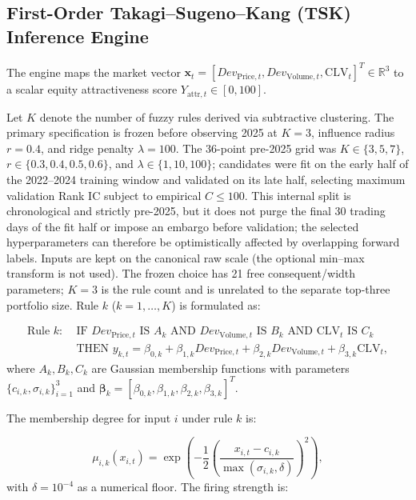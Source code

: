 \documentclass[pdflatex,sn-mathphys-num]{sn-jnl}
\theoremstyle{thmstyleone}
\theoremstyle{thmstyletwo}
\theoremstyle{thmstylethree}
\begin{document}
\subsection{First-Order Takagi--Sugeno--Kang (TSK) Inference Engine}\label{subsec3_2}

The engine maps the market vector $\mathbf{x}_t = [Dev_{\mathrm{Price},t}, Dev_{\mathrm{Volume},t}, \mathrm{CLV}_t]^T \in \mathbb{R}^3$ to a scalar equity attractiveness score $Y_{\mathrm{attr},t} \in [0, 100]$.

Let $K$ denote the number of fuzzy rules derived via subtractive clustering. The
primary specification is frozen before observing 2025 at $K=3$, influence radius
$r=0.4$, and ridge penalty $\lambda=100$. The 36-point pre-2025 grid was
$K\in\{3,5,7\}$, $r\in\{0.3,0.4,0.5,0.6\}$, and
$\lambda\in\{1,10,100\}$; candidates were fit on the early half of the
2022--2024 training window and validated on its late half, selecting maximum
validation Rank IC subject to empirical $C\leq100$. This internal split is
chronological and strictly pre-2025, but it does not purge the final 30
trading days of the fit half or impose an embargo before validation; the
selected hyperparameters can therefore be optimistically affected by
overlapping forward labels. Inputs are kept on the
canonical raw scale (the optional min--max transform is not used). The frozen
choice has 21 free consequent/width parameters; $K=3$ is the rule count and is
unrelated to the separate top-three portfolio size. Rule $k$ ($k = 1,\dots,K$) is formulated as:

\begin{equation}
    \begin{split}
    \text{Rule } k: \;& \text{IF } Dev_{\mathrm{Price},t} \text{ IS } A_k \text{ AND } Dev_{\mathrm{Volume},t} \text{ IS } B_k \text{ AND } \mathrm{CLV}_t \text{ IS } C_k \\
    & \text{THEN } y_{k,t} = \beta_{0,k} + \beta_{1,k} Dev_{\mathrm{Price},t} + \beta_{2,k} Dev_{\mathrm{Volume},t} + \beta_{3,k} \mathrm{CLV}_t,
    \end{split}
    \label{eq:tsk_rule}
\end{equation}
where $A_k, B_k, C_k$ are Gaussian membership functions with parameters $\{c_{i,k}, \sigma_{i,k}\}_{i=1}^3$ and $\boldsymbol{\beta}_k = [\beta_{0,k}, \beta_{1,k}, \beta_{2,k}, \beta_{3,k}]^T$.

The membership degree for input $i$ under rule $k$ is:

\begin{equation}
    \mu_{i,k}(x_{i,t}) = \exp \left( -\frac{1}{2} \left( \frac{x_{i,t} - c_{i,k}}{\max(\sigma_{i,k}, \delta)} \right)^2 \right),
    \label{eq:gauss_mf}
\end{equation}
with $\delta = 10^{-4}$ as a numerical floor. The firing strength is:
\end{document}
